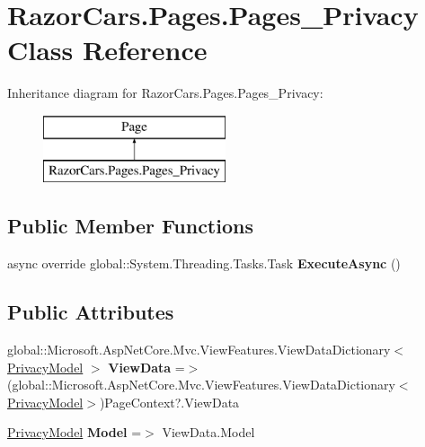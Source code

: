 \hypertarget{class_razor_cars_1_1_pages_1_1_pages___privacy}{}\section{Razor\+Cars.\+Pages.\+Pages\+\_\+\+Privacy Class Reference}
\label{class_razor_cars_1_1_pages_1_1_pages___privacy}
Inheritance diagram for Razor\+Cars.\+Pages.\+Pages\+\_\+\+Privacy\+:\begin{figure}[H]
\begin{center}
\leavevmode
\includegraphics[height=2.000000cm]{class_razor_cars_1_1_pages_1_1_pages___privacy}
\end{center}
\end{figure}
\subsection*{Public Member Functions}
\begin{DoxyCompactItemize}
\item 
\mbox{\label{class_razor_cars_1_1_pages_1_1_pages___privacy_a1bbef1692ed593945b629da9fa5ec5bc}} 
async override global\+::\+System.\+Threading.\+Tasks.\+Task {\bfseries Execute\+Async} ()
\end{DoxyCompactItemize}
\subsection*{Public Attributes}
\begin{DoxyCompactItemize}
\item 
\mbox{\label{class_razor_cars_1_1_pages_1_1_pages___privacy_acac1e7f71ed44a792cd02ed7cb3360b6}} 
global\+::\+Microsoft.\+Asp\+Net\+Core.\+Mvc.\+View\+Features.\+View\+Data\+Dictionary$<$ \mbox{\hyperlink{class_razor_cars_1_1_pages_1_1_privacy_model}{Privacy\+Model}} $>$ {\bfseries View\+Data} =$>$ (global\+::\+Microsoft.\+Asp\+Net\+Core.\+Mvc.\+View\+Features.\+View\+Data\+Dictionary$<$\mbox{\hyperlink{class_razor_cars_1_1_pages_1_1_privacy_model}{Privacy\+Model}}$>$)Page\+Context?.View\+Data
\item 
\mbox{\label{class_razor_cars_1_1_pages_1_1_pages___privacy_a174eb0b3e9e4531a226020b34edb8def}} 
\mbox{\hyperlink{class_razor_cars_1_1_pages_1_1_privacy_model}{Privacy\+Model}} {\bfseries Model} =$>$ View\+Data.\+Model
\end{DoxyCompactItemize}
